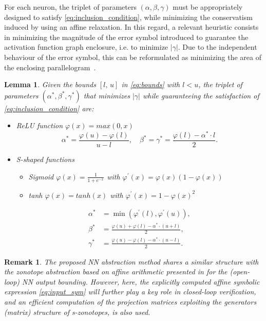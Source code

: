 \documentclass[journal]{IEEEtran}
\newtheorem{mylemma}{Lemma}
\newtheorem{myremark}{Remark}
\begin{document}
For each neuron, the triplet of parameters $(\alpha, \beta, \gamma)$ must be  appropriately designed to satisfy \eqref{eq:inclusion_condition}, while minimizing the conservatism induced by using an affine relaxation. In this regard, a relevant heuristic consists in minimizing the magnitude of the error symbol introduced to guarantee the activation function graph enclosure, i.e. to minimize $|\gamma|$. Due to the independent behaviour of the error symbol, this can be reformulated as minimizing the area of the enclosing parallelogram~\cite{singh2018fast}.

\begin{mylemma}\label{lem:triplets}
Given the bounds $[l, \, u]$ in \eqref{eq:bounds} with $l < u$, the triplet of parameters $(\alpha^*, \beta^*, \gamma^*)$ that minimizes $|\gamma|$ while guaranteeing the satisfaction of \eqref{eq:inclusion_condition} are:
\begin{itemize}[leftmargin =*]
    \item ReLU function  $\varphi(x) = max(0,x)$ 
    \begin{equation}
     \alpha^* = \frac{\varphi(u)-\varphi(l)}{u-l}, \quad \beta^* = \gamma^* = \frac{\varphi(l)-\alpha^* \cdot l}{2}.
\end{equation}
    \item S-shaped functions
    \begin{itemize}
        \item   Sigmoid $\varphi(x) = \frac{1}{1+e^{-x}}$ with $\varphi^\prime(x) = \varphi(x)(1-\varphi(x))$
        \item tanh $\varphi(x) = tanh(x)$ with $\varphi^\prime(x) = 1-\varphi(x)^2$
    \end{itemize}
    \vspace*{2mm}
    \begin{equation}
        \begin{aligned}
         \alpha^* &= \min(\varphi^\prime(l),\varphi^\prime(u)), \\
         \beta^* &= \frac{\varphi(u)+ \varphi(l) - \alpha^* \cdot  (u+l)}{2}, \\
        \gamma^* &= \frac{\varphi(u) - \varphi(l) - \alpha^* \cdot (u -l)}{2}.
    \end{aligned}
    \end{equation}
\end{itemize}
\end{mylemma}

\begin{myremark}
The proposed NN abstraction method shares a similar structure with the zonotope abstraction based on affine arithmetic presented in \cite{singh2018fast} for the (open-loop) NN output bounding. However, here, the explicitly computed  affine symbolic expression \eqref{eq:input_sym} will further play a key role in closed-loop verification, and an efficient computation of the projection matrices exploiting the generators (matrix) structure of s-zonotopes, is also used.
\end{myremark}
\end{document}
